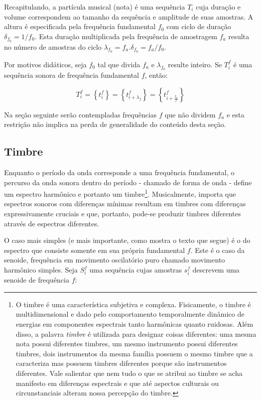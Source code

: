 Recapitulando, a partícula musical (nota) é uma sequência $T_i$ cuja duração e volume correspondem ao tamanho da sequência e amplitude de suas amostras. A altura é especificada pela frequência fundamental $f_0$ com ciclo de duração $\delta_{f_0} = 1/f_0$. Esta duração multiplicada pela frequência de amostragem $f_a$ resulta no número de amostras
do ciclo $\lambda_{f_0}=f_a . \delta_{f_0} =f_a/f_0$.

Por motivos didáticos, seja $f_0$ tal que divida $f_a$ e $\lambda_{f_0}$ resulte inteiro.
Se $T_i^f$ é uma sequência sonora de frequência fundamental $f$, então:
    
\begin{equation}\label{periodicidade}
     T^f_i=\left\{ t_i^f \right\}=\left\{ t^f_{i+\lambda_{f}}  \right\}= \left\{ t^f_{i+\frac{f_a}{f}} \right\}
\end{equation}

Na seção seguinte serão contempladas frequências $f$ que não dividem $f_a$ e esta restrição não implica na perda de generalidade do conteúdo desta seção.

\subsection{Timbre}
Enquanto o período da onda corresponde a uma frequência fundamental, o percurso
da onda sonora dentro do período - chamado de forma de onda - define um espectro harmônico e portanto
um timbre\footnote{O timbre é uma característica subjetiva e complexa. Fisicamente,
o timbre é multidimensional e dado pelo comportamento temporalmente dinâmico
de energias em componentes espectrais tanto harmônicas quanto ruidosas.
Além disso, a palavra \emph{timbre} é utilizada para designar coisas diferentes: uma mesma nota
possui diferentes timbres, um mesmo instrumento possui diferentes timbres, dois instrumentos da mesma família possuem o mesmo timbre que a caracteriza mas possuem timbres diferentes porque são instrumentos diferentes.
  Vale salientar que nem tudo
o que se atribui ao timbre se acha manifesto em diferenças espectrais e que até
aspectos culturais ou circunstanciais alteram nossa percepção do timbre.
}. Musicalmente, importa que espectros sonoros com diferenças mínimas resultam em timbres com diferenças expressivamente cruciais e que, portanto, pode-se produzir timbres diferentes através de espectros diferentes.\cite{Roederer}


O caso mais simples (e mais importante, como mostra o texto que segue) é o do espectro que consiste somente
em sua própria fundamental $f$. Este é o caso da senoide, frequência em movimento oscilatório puro chamado
movimento harmônico simples. Seja $S_i^f$ uma sequência cujas amostras
$s_i^f$ descrevem uma senoide de frequência $f$:

